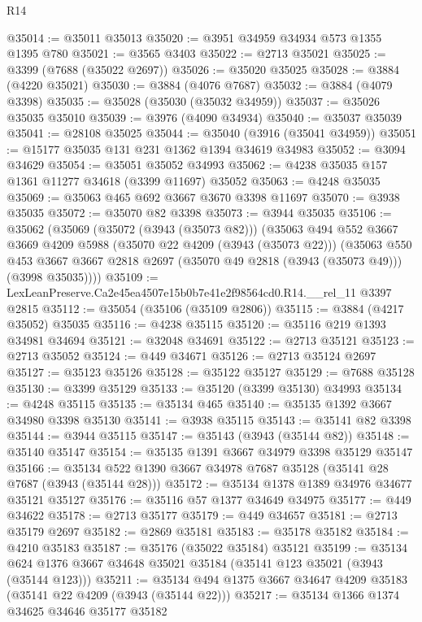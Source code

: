 \begin{lexlean}{R14}
\begin{coremodule}
@35014 := @35011 @35013
@35020 := @3951 @34959 @34934 @573 @1355 @1395 @780
@35021 := @3565 @3403
@35022 := @2713 @35021
@35025 := @3399 (@7688 (@35022 @2697))
@35026 := @35020 @35025
@35028 := @3884 (@4220 @35021)
@35030 := @3884 (@4076 @7687)
@35032 := @3884 (@4079 @3398)
@35035 := @35028 (@35030 (@35032 @34959))
@35037 := @35026 @35035 @35010
@35039 := @3976 (@4090 @34934)
@35040 := @35037 @35039
@35041 := @28108 @35025
@35044 := @35040 (@3916 (@35041 @34959))
@35051 := @15177 @35035 @131 @231 @1362 @1394 @34619 @34983
@35052 := @3094 @34629
@35054 := @35051 @35052 @34993
@35062 := @4238 @35035 @157 @1361 @11277 @34618 (@3399 @11697) @35052
@35063 := @4248 @35035
@35069 := @35063 @465 @692 @3667 @3670 @3398 @11697
@35070 := @3938 @35035
@35072 := @35070 @82 @3398
@35073 := @3944 @35035
@35106 := @35062
    (@35069
      (@35072 (@3943 (@35073 @82)))
      (@35063
        @494
        @552
        @3667
        @3669
        @4209
        @5988
        (@35070 @22 @4209 (@3943 (@35073 @22)))
        (@35063
          @550
          @453
          @3667
          @3667
          @2818
          @2697
          (@35070 @49 @2818 (@3943 (@35073 @49)))
          (@3998 @35035))))
@35109 := LexLeanPreserve.Ca2e45ea4507e15b0b7e41e2f98564cd0.R14.__rel_11 @3397 @2815
@35112 := @35054 (@35106 (@35109 @2806))
@35115 := @3884 (@4217 @35052) @35035
@35116 := @4238 @35115
@35120 := @35116 @219 @1393 @34981 @34694
@35121 := @32048 @34691
@35122 := @2713 @35121
@35123 := @2713 @35052
@35124 := @449 @34671
@35126 := @2713 @35124 @2697
@35127 := @35123 @35126
@35128 := @35122 @35127
@35129 := @7688 @35128
@35130 := @3399 @35129
@35133 := @35120 (@3399 @35130) @34993
@35134 := @4248 @35115
@35135 := @35134 @465
@35140 := @35135 @1392 @3667 @34980 @3398 @35130
@35141 := @3938 @35115
@35143 := @35141 @82 @3398
@35144 := @3944 @35115
@35147 := @35143 (@3943 (@35144 @82))
@35148 := @35140 @35147
@35154 := @35135 @1391 @3667 @34979 @3398 @35129 @35147
@35166 := @35134 @522 @1390 @3667 @34978 @7687 @35128 (@35141 @28 @7687 (@3943 (@35144 @28)))
@35172 := @35134 @1378 @1389 @34976 @34677 @35121 @35127
@35176 := @35116 @57 @1377 @34649 @34975
@35177 := @449 @34622
@35178 := @2713 @35177
@35179 := @449 @34657
@35181 := @2713 @35179 @2697
@35182 := @2869 @35181
@35183 := @35178 @35182
@35184 := @4210 @35183
@35187 := @35176 (@35022 @35184) @35121
@35199 := @35134 @624 @1376 @3667 @34648 @35021 @35184 (@35141 @123 @35021 (@3943 (@35144 @123)))
@35211 := @35134 @494 @1375 @3667 @34647 @4209 @35183 (@35141 @22 @4209 (@3943 (@35144 @22)))
@35217 := @35134 @1366 @1374 @34625 @34646 @35177 @35182

\end{coremodule}
\end{lexlean}
